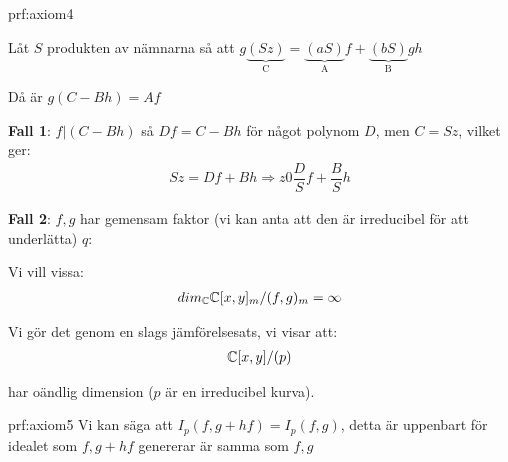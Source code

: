 \begin{prf}[Axiom 4]{prf:axiom4}
  \par\bigskip
  \noindent Låt $S$ produkten av nämnarna så att $g\underbrace{(Sz)}_{\text{C}} = \underbrace{(aS)}_{\text{A}}f+\underbrace{(bS)}_{\text{B}}gh$\par
  \noindent Då är $g(C-Bh) = Af$
  \par\bigskip
  \noindent\textbf{Fall 1}: $f|(C-Bh)$ så $Df = C-Bh$ för något polynom $D$, men $C = Sz$, vilket ger:
  \begin{equation*}
    \begin{gathered}
      Sz = Df+Bh\Rightarrow z 0 \dfrac{D}{S}f+\dfrac{B}{S}h
    \end{gathered}
  \end{equation*}
  \par\bigskip
  \noindent\textbf{Fall 2}: $f,g$ har gemensam faktor (vi kan anta att den är irreducibel för att underlätta) $q$:\par
  \noindent Vi vill vissa:
  \begin{equation*}
    \begin{gathered}
      dim_{\mathbb{C}} \mathbb{C}[x,y]_m/(f,g)_m = \infty
    \end{gathered}
  \end{equation*}
  \par\bigskip
  \noindent Vi gör det genom en slags jämförelsesats, vi visar att:
  \begin{equation*}
    \begin{gathered}
      \mathbb{C}[x,y]/(p)
    \end{gathered}
  \end{equation*}\par
  \noindent har oändlig dimension ($p$ är en irreducibel kurva).
\end{prf}
\par\bigskip
\begin{prf}[Axiom 5]{prf:axiom5}
  Vi kan säga att $I_p(f,g+hf) = I_p(f,g)$, detta är uppenbart för idealet som $f,g+hf$ genererar är samma som $f,g$ 
\end{prf}
